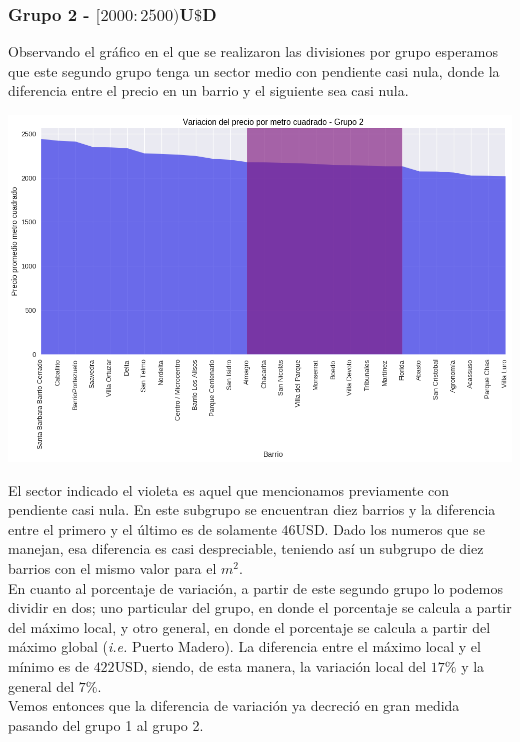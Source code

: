 \documentclass[a4paper, 10pt]{article}
\newcommand\tab[1][0.5cm]{\hspace*{#1}}
\begin{document}
				\subsubsection{Grupo 2 - $[2000:2500)$U$\$$D}
					Observando el gráfico en el que se realizaron las divisiones por grupo esperamos que este segundo grupo
					tenga un sector medio con pendiente casi nula, donde la diferencia entre el precio en un barrio y el
					siguiente sea casi nula.
					\begin{center}
   		    				\includegraphics[width=\textwidth]{images/m2Group2Area}
				  	\end{center}
				  	\tab El sector indicado el violeta es aquel que mencionamos previamente con pendiente casi nula. En este
				  	subgrupo se encuentran diez barrios y la diferencia entre el primero y el último es de solamente $46$USD.
				  	Dado los numeros que se manejan, esa diferencia es casi despreciable, teniendo así un subgrupo de diez 
				  	barrios con el mismo valor para el $m^2$. \\
				  	\tab En cuanto al porcentaje de variación, a partir de este segundo grupo lo podemos dividir en dos; uno
				  	particular del grupo, en donde el porcentaje se calcula a partir del máximo local, y otro general, en donde
				  	el porcentaje se calcula a partir del máximo global (\emph{i.e.} Puerto Madero). La diferencia entre el
				  	máximo local y el mínimo es de $422$USD, siendo, de esta manera, la variación local del $17\%$ y la general
				  	del $7\%$. \\
				  	\tab Vemos entonces que la diferencia de variación ya decreció en gran medida pasando del grupo 1 al grupo 2.
\end{document}
